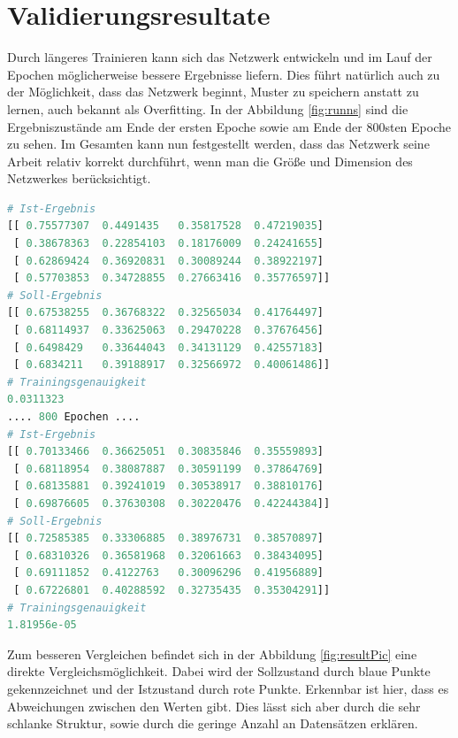 \section{Validierungsresultate}

Durch längeres Trainieren kann sich das Netzwerk entwickeln und im Lauf der Epochen möglicherweise bessere Ergebnisse liefern. 
Dies führt natürlich auch zu der Möglichkeit, dass das Netzwerk beginnt, Muster zu speichern anstatt zu lernen, auch bekannt als Overfitting. 
In der Abbildung \ref{fig:runns} sind die Ergebniszustände am Ende der ersten Epoche sowie am Ende der 800sten Epoche zu sehen. 
Im Gesamten kann nun festgestellt werden, dass das Netzwerk seine Arbeit relativ korrekt durchführt, wenn man die Größe und Dimension des Netzwerkes berücksichtigt. 
\begin{lstlisting}[caption={Ergebnisse am Ende der ersten Epoche und am Ende der $800$ Epoche},label=fig:runns,captionpos=b,language=Python]
# Ist-Ergebnis 
[[ 0.75577307  0.4491435   0.35817528  0.47219035]
 [ 0.38678363  0.22854103  0.18176009  0.24241655]
 [ 0.62869424  0.36920831  0.30089244  0.38922197]
 [ 0.57703853  0.34728855  0.27663416  0.35776597]]
# Soll-Ergebnis
[[ 0.67538255  0.36768322  0.32565034  0.41764497]
 [ 0.68114937  0.33625063  0.29470228  0.37676456]
 [ 0.6498429   0.33644043  0.34131129  0.42557183]
 [ 0.6834211   0.39188917  0.32566972  0.40061486]]
# Trainingsgenauigkeit
0.0311323
.... 800 Epochen ....
# Ist-Ergebnis
[[ 0.70133466  0.36625051  0.30835846  0.35559893]
 [ 0.68118954  0.38087887  0.30591199  0.37864769]
 [ 0.68135881  0.39241019  0.30538917  0.38810176]
 [ 0.69876605  0.37630308  0.30220476  0.42244384]]
# Soll-Ergebnis
[[ 0.72585385  0.33306885  0.38976731  0.38570897]
 [ 0.68310326  0.36581968  0.32061663  0.38434095]
 [ 0.69111852  0.4122763   0.30096296  0.41956889]
 [ 0.67226801  0.40288592  0.32735435  0.35304291]]
# Trainingsgenauigkeit
1.81956e-05
\end{lstlisting}
Zum besseren Vergleichen befindet sich in der Abbildung \ref{fig:resultPic} eine direkte Vergleichsmöglichkeit. 
Dabei wird der Sollzustand durch blaue Punkte gekennzeichnet und der Istzustand durch rote Punkte. 
Erkennbar ist hier, dass es Abweichungen zwischen den Werten gibt. 
Dies lässt sich aber durch die sehr schlanke Struktur, sowie durch die geringe Anzahl an Datensätzen erklären. 

